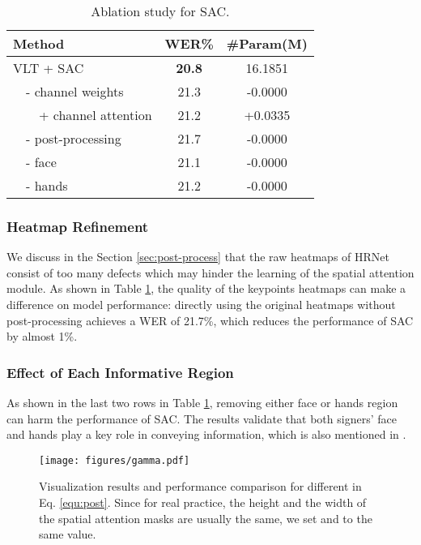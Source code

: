 \documentclass[acmsmall,screen]{acmart}
\def \tbf{\textbf}
\begin{document}
\begin{table}[t]
  \centering
  \caption{Ablation study for SAC.}
  \begin{tabular}{l|cc}
    \toprule
    Method & WER\% & \#Param(M)\\
    \midrule
    VLT + SAC & \tbf{20.8} & 16.1851 \\
    \ \ - channel weights & 21.3 & -0.0000 \\
    \ \ \ \ + channel attention  \cite{woo2018cbam} & 21.2 & +0.0335\\
    \ \ - post-processing & 21.7 & -0.0000 \\
    \ \ - face & 21.1 & -0.0000 \\
    \ \ - hands & 21.2 & -0.0000 \\
    \bottomrule
  \end{tabular}
  \label{tab:sac}
\end{table} \subsubsection{Heatmap Refinement}
We discuss in the Section \ref{sec:post-process} that the raw heatmaps of HRNet \cite{sun2019deep} consist of too many defects which may hinder the learning of the spatial attention module.
As shown in Table \ref{tab:sac}, the quality of the keypoints heatmaps can make a difference on model performance: directly using the original heatmaps without post-processing achieves a WER of 21.7\%, which reduces the performance of SAC by almost 1\%.


\subsubsection{Effect of Each Informative Region}
As shown in the last two rows in Table \ref{tab:sac}, removing either face or hands region can harm the performance of SAC. The results validate that both signers' face and hands play a key role in conveying information, which is also mentioned in \cite{stmc, koller2020quantitative}.


\begin{figure}[!t]
\centering
\texttt{[image: figures/gamma.pdf]}
\caption{Visualization results and performance comparison for different  in Eq. \ref{equ:post}. Since for real practice, the height and the width of the spatial attention masks are usually the same, we set  and  to the same value.}
\label{fig:gamma}
\end{figure}
\end{document}
